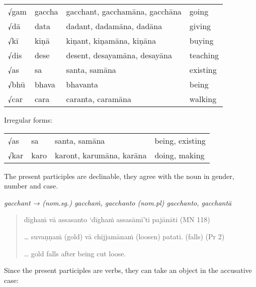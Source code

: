 \documentclass[11pt,oneside]{memoir}
\begin{document}
\begin{center}
\begin{tabular}{llll}
√gam & gaccha & gacchant, gacchamāna, gacchāna & going\\[0pt]
√dā & data & dadant, dadamāna, dadāna & giving\\[0pt]
√kī & kiṇā & kiṇant, kiṇamāna, kiṇāna & buying\\[0pt]
√dis & dese & desent, desayamāna, desayāna & teaching\\[0pt]
√as & sa & santa, samāna & existing\\[0pt]
√bhū & bhava & bhavanta & being\\[0pt]
√car & cara & caranta, caramāna & walking\\[0pt]
\end{tabular}
\end{center}

Irregular forms:

\begin{center}
\begin{tabular}{llll}
√as & sa & santa, samāna & being, existing\\[0pt]
√kar & karo & karont, karumāna, karāna & doing, making\\[0pt]
\end{tabular}
\end{center}

The present participles are declinable, they agree with the noun in gender, number and case.

\emph{gacchant → (nom.sg.) gacchaṁ, gacchanto (nom.pl) gacchanto, gacchantā}

\begin{quote}
dīghaṁ vā assasanto `dīghaṁ assasāmī'ti pajānāti (MN 118)

\bigskip

\ldots{} suvaṇṇaṁ (gold) vā chijjamānaṁ (loosen) patati. (falls) (Pr 2)

\ldots{} gold falls after being cut loose.
\end{quote}

Since the present participles are verbs, they can take an object in the accusative case:
\end{document}
